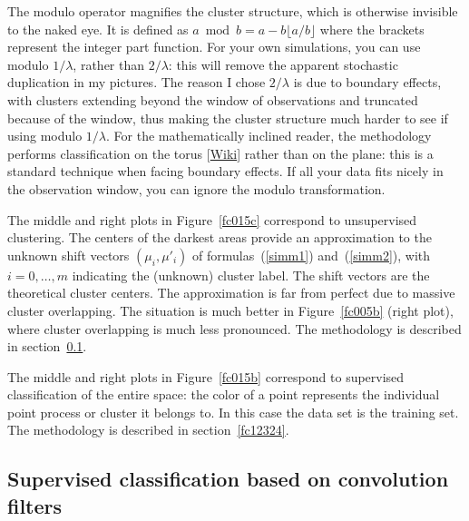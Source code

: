 \documentclass[oneside,10pt]{book}
\begin{document}
The modulo operator  magnifies the cluster structure, which is otherwise invisible to the naked eye.  It is defined as 
$a \bmod b = a -  b \lfloor a/b \rfloor$ where the brackets represent the integer part function. For your own simulations, you can use modulo $1/\lambda$, 
rather than $2/\lambda$: this will remove the apparent stochastic duplication in my pictures. The reason I chose $2/\lambda$ is due to boundary effects, with clusters extending beyond 
the window of observations and truncated because of the window, thus making the cluster structure much harder to see if using modulo $1/\lambda$.  For the mathematically inclined reader, the methodology performs 
\textcolor{index}{classification on the torus} [\href{https://en.wikipedia.org/wiki/Periodic_boundary_conditions}{Wiki}] rather than on the plane: this is a standard technique when facing boundary effects. If all your data fits nicely in the observation window, you can ignore the modulo transformation.

The middle and right plots in Figure~\ref{fc015c} correspond to \textcolor{index}{unsupervised clustering}. The centers of the darkest areas provide an approximation to the unknown shift vectors
$(\mu_i,\mu'_i)$ of formulas~(\ref{simm1}) and~(\ref{simm2}), with $i=0,\dots,m$ indicating the (unknown) cluster label. The shift vectors are the theoretical cluster centers. The approximation is far from perfect due to massive cluster overlapping. 
The situation is much better in Figure~\ref{fc005b} (right plot), where cluster overlapping is much less pronounced. The methodology is described in section~\ref{fc12323}. 

The middle and right plots in Figure~\ref{fc015b}  correspond to \textcolor{index}{supervised classification} of the entire space:  the color of a point represents the individual point process or cluster it belongs to. In this case the data set is the training set. The methodology is described in section~\ref{fc12324}. 


\subsection{Supervised classification based on convolution filters}\label{fc12323}
\end{document}
